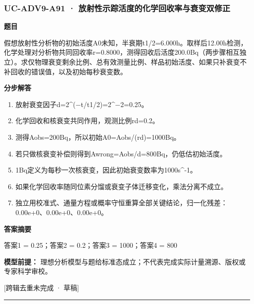 \documentclass[UTF8,11pt,a4paper]{ctexart}
\begin{document}
\subsubsection*{UC-ADV9-A91 · 放射性示踪活度的化学回收率与衰变双修正}
\noindent\textbf{题目}\par
假想放射性分析物的初始活度A0未知，半衰期t1/2=6.000h。取样后12.00h检测，化学处理对分析物共同回收率r=0.8000，测得回收后活度200.0Bq（两步骤相互独立）。求仅物理衰变剩余比例、总有效测量比例、样品初始活度、如果只补衰变不补回收的错误值，以及初始每秒衰变数。\par
\medskip\noindent\textbf{分步解答}
\begin{enumerate}
\item 放射衰变因子d=2\textasciicircum{}(−t/t1/2)=2\textasciicircum{}−2=0.25。
\item 化学回收和核衰变共同作用，观测比例rd=0.2。
\item 测得Aobs=200Bq，所以初始A0=Aobs/(rd)=1000Bq。
\item 若只做核衰变补偿则得到Awrong=Aobs/d=800Bq，仍低估初始活度。
\item 1Bq定义为每秒一次核衰变，因此初始衰变数率为1000s\textasciicircum{}-1。
\item 如果化学回收率随同位素分馏或衰变子体迁移变化，乘法分离不成立。
\item 独立用校准式、通量方程或概率守恒重算全部关键结论，归一化残差：0.00e+0、0.00e+0、0.00e+0。
\end{enumerate}
\noindent\textbf{答案摘要}\par
答案1 = 0.25；答案2 = 0.2；答案3 = 1000；答案4 = 800\par
\noindent\textbf{模型前提：}
理想分析模型与题给标准态成立；不代表完成实际计量溯源、版权或专家科学审校。\par
\noindent\textcolor{red!65!black}{[跨辑去重未完成 · 草稿]} \par
\medskip\hrule\medskip
{}
\end{document}
